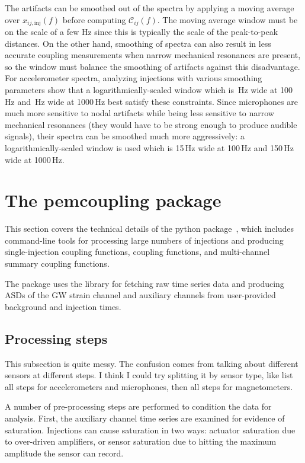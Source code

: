 The artifacts can be smoothed out of the spectra by applying a moving average over $x_{ij,\mathrm{inj}}(f)$ before computing $\mathcal{C}_{ij}(f)$.
The moving average window must be on the scale of a few Hz since this is typically the scale of the peak-to-peak distances.
On the other hand, smoothing of spectra can also result in less accurate coupling measurements when narrow mechanical resonances are present, so the window must balance the smoothing of artifacts against this disadvantage.
For accelerometer spectra, analyzing injections with various smoothing parameters show that a logarithmically-scaled window which is \XX\,Hz wide at 100\,Hz and \XX\,Hz wide at 1000\,Hz best satisfy these constraints.
Since microphones are much more sensitive to nodal artifacts while being less sensitive to narrow mechanical resonances (they would have to be strong enough to produce audible signals), their spectra can be smoothed much more aggressively: a logarithmically-scaled window is used which is 15\,Hz wide at 100\,Hz and 150\,Hz wide at 1000\,Hz.

\section{The {\selectfont pemcoupling}\xspace package}
\label{sec:pemcoupling}

This section covers the technical details of the \pemcoupling python package~\citep{pem_code}, which includes command-line tools for processing large numbers of injections and producing single-injection coupling functions, coupling functions, and multi-channel summary coupling functions.

The package uses the  library for fetching raw time series data and producing \acp{ASD} of the \ac{GW} strain channel and auxiliary channels from user-provided background and injection times.

\subsection{Processing steps}

{\color{red}
This subsection is quite messy.
The confusion comes from talking about different sensors at different steps.
I think I could try splitting it by sensor type, like list all steps for accelerometers and microphones, then all steps for magnetometers.}

A number of pre-processing steps are performed to condition the data for analysis.
First, the auxiliary channel time series are examined for evidence of saturation.
Injections can cause saturation in two ways: actuator saturation due to over-driven amplifiers, or sensor saturation due to hitting the maximum amplitude the sensor can record.

